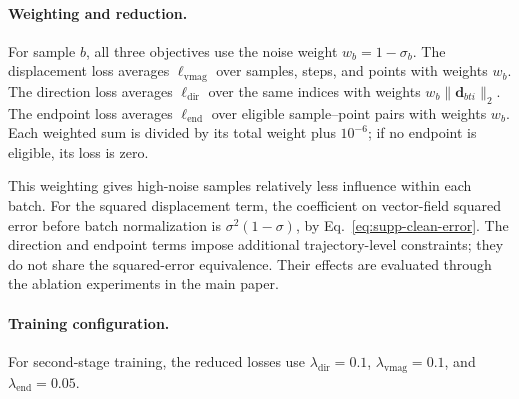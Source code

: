 \paragraph{Weighting and reduction.}
For sample $b$, all three objectives use the noise weight
$w_b=1-\sigma_b$. The displacement loss averages
$\ell_{\mathrm{vmag}}$ over samples, steps, and points with weights $w_b$.
The direction loss averages $\ell_{\mathrm{dir}}$ over the same indices
with weights $w_b\|\mathbf{d}_{bti}\|_2$.
The endpoint loss averages $\ell_{\mathrm{end}}$ over eligible sample--point
pairs with weights $w_b$. Each weighted sum is divided by its total weight
plus $10^{-6}$; if no endpoint is eligible, its loss is zero.

This weighting gives high-noise samples relatively less influence within
each batch. For the squared displacement term, the coefficient on
vector-field squared error before batch normalization is
$\sigma^2(1-\sigma)$, by Eq.~\eqref{eq:supp-clean-error}.
The direction and endpoint terms impose additional trajectory-level
constraints; they do not share the squared-error equivalence.
Their effects are evaluated through the ablation experiments in the
main paper.

\paragraph{Training configuration.}
For second-stage training, the reduced losses use
$\lambda_{\mathrm{dir}}=0.1$,
$\lambda_{\mathrm{vmag}}=0.1$, and
$\lambda_{\mathrm{end}}=0.05$.